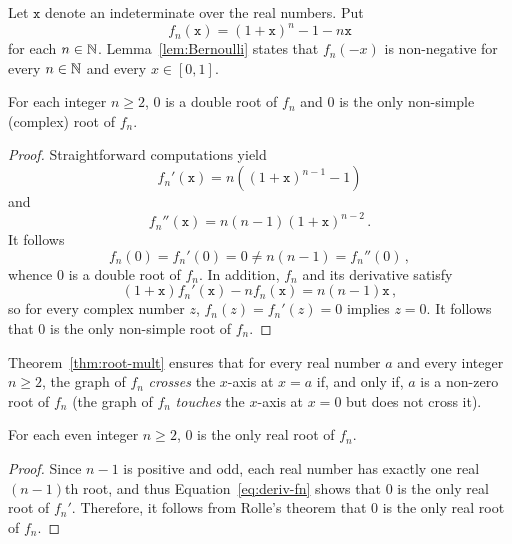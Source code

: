 
\newcommand{\ttx}{\mathtt{x}}

Let  $\ttx$ denote an indeterminate over the real numbers.
Put
$$
f_n(\ttx) = {(1 + \ttx)}^n - 1 - n \ttx 
$$
for each $n \in \mathbb{N}$.
Lemma~\ref{lem:Bernoulli} states that $f_n(- x)$ is non-negative for every $n \in \mathbb{N}$ and every $x \in [0, 1]$.

\begin{theorem} \label{thm:root-mult}
  For each integer $n \ge 2$,
  $0$ is a double root of $f_n$ and $0$ is the only non-simple (complex) root of $f_n$.
\end{theorem}

\begin{proof}
  Straightforward computations yield
  \begin{equation} \label{eq:deriv-fn} 
  f_n'(\ttx)  = n \left( {(1 + \ttx)}^{n - 1} -  1 \right) 
  \end{equation}
  and
  $$
  f_n''(\ttx)  = n (n - 1) {(1 + \ttx)}^{n - 2} \,.
  $$
  It follows
  $$
  f_n(0) = f_n'(0) = 0 \ne n (n - 1) = f_n''(0) \, ,
  $$
  whence $0$ is a double root of $f_n$.
  In addition, $f_n$ and its derivative satisfy 
   $$
   (1 + \ttx) f_n'(\ttx) - n f_n(\ttx) = n (n - 1) \ttx \, ,
   $$
   so for every complex number $z$, $f_n(z) = f_n'(z) = 0$ implies $z = 0$.
   It follows that $0$ is the only non-simple root of $f_n$.
\end{proof}

Theorem~\ref{thm:root-mult} ensures that for every real number $a$ and every integer $n \ge 2$,
the graph of $f_n$ \emph{crosses} the $x$-axis at $x = a$ if, and only if, $a$ is a non-zero root of $f_n$
(the graph of $f_n$ \emph{touches} the $x$-axis at $x = 0$ but does not cross it).

\begin{theorem} \label{thm:even-one-root}
  For each even integer $n \ge 2$,
  $0$ is the only real root of $f_n$.
 \end{theorem} 

 \begin{proof}
   Since $n - 1$ is positive and odd,
   each real number has exactly one real $(n - 1)$th root,
   and thus Equation~\eqref{eq:deriv-fn} shows that $0$ is the only real root of $f_n'$.
   Therefore, it follows from Rolle's theorem that $0$ is the only real root of $f_n$.
 \end{proof} 

